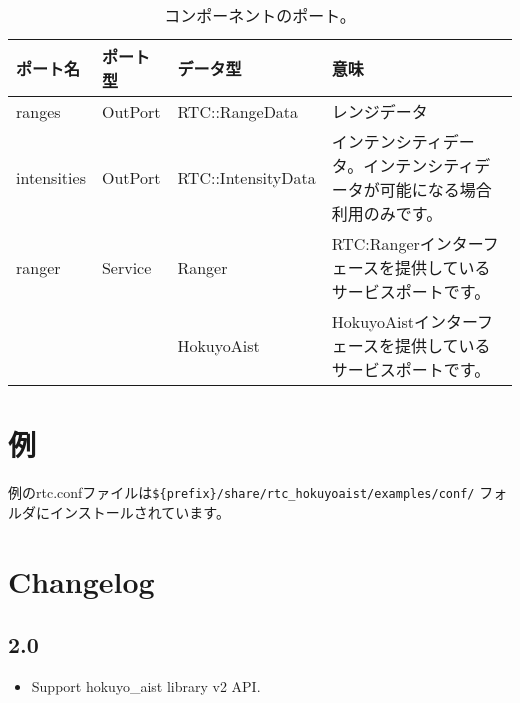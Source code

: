 \documentclass[a4paper,10pt]{article}
\newenvironment{Japanese}{%
  \CJKfamily{min}%
  \CJKtilde
  \CJKnospace}{}
\begin{document}
\begin{CJK}{UTF8}{}
\begin{Japanese}
\begin{table}[t]
  \centering
  \begin{tabularx}{\columnwidth}{lllX}
    \toprule
    ポート名 & ポート型 & データ型 & 意味 \\
    \midrule
    ranges & OutPort & RTC::RangeData & レンジデータ \\
    intensities & OutPort & RTC::IntensityData & インテンシティデータ。インテンシティデータが可能になる場合利用のみです。 \\
    ranger & Service & Ranger & RTC:Rangerインターフェースを提供しているサービスポートです。 \\
    & & HokuyoAist & HokuyoAistインターフェースを提供しているサービスポートです。 \\
    \bottomrule
  \end{tabularx}
  \caption{コンポーネントのポート。}
  \label{tab:ports}
\end{table}

\section{例}
\label{sec:examples}

例のrtc.confファイルは\verb|${prefix}/share/rtc_hokuyoaist/examples/conf/|
フォルダにインストールされています。

\section{Changelog}

\subsection{2.0}

\begin{itemize}
  \item Support hokuyo\_aist library v2 API.
\end{itemize}

\end{Japanese}
\end{CJK}
\end{document}
